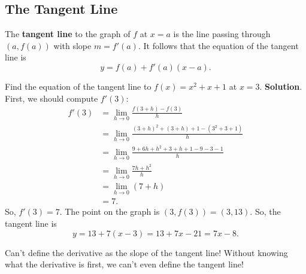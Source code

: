 \subsection{The Tangent Line}
\begin{Definition}{}{}
    The \textbf{tangent line} to the graph of $ f $ at $ x=a $ is the line passing through $ (a,f(a)) $ with slope $ m=f'(a) $.
    It follows that the equation of the tangent line is
    \[ y=f(a)+f'(a)(x-a). \]
\end{Definition}
\begin{Example}{}{}
    Find the equation of the tangent line to $ f(x)=x^2+x+1 $ at $ x=3 $.
    \tcblower{}
    \textbf{Solution}. First, we should compute $ f'(3) $:
    \begin{align*}
        f'(3)
         & =\lim\limits_{{h} \to {0}}\frac{f(3+h)-f(3)}{h}               \\
         & =\lim\limits_{{h} \to {0}}\frac{(3+h)^2+(3+h)+1-(3^2+3+1)}{h} \\
         & =\lim\limits_{{h} \to {0}}\frac{9+6h+h^2+3+h+1-9-3-1}{h}      \\
         & =\lim\limits_{{h} \to {0}}\frac{7h+h^2}{h}                    \\
         & =\lim\limits_{{h} \to {0}}(7+h)                               \\
         & =7.
    \end{align*}
    So, $ f'(3)=7 $. The point on the graph is $ (3,f(3))=(3,13) $. So, the tangent line is
    \[ y=13+7(x-3)=13+7x-21=7x-8. \]
\end{Example}
\begin{Remark}{}{}
    Can't define the derivative as the slope of the tangent line! Without knowing what the derivative is first, we can't
    even define the tangent line!
\end{Remark}
